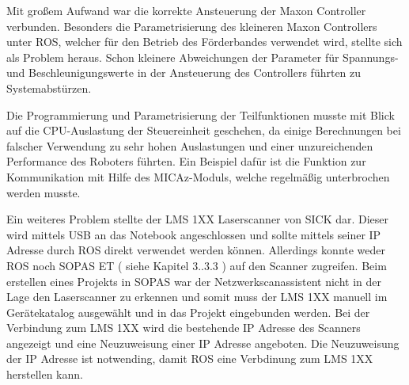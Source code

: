 Mit großem Aufwand war die korrekte Ansteuerung der Maxon Controller verbunden. Besonders die Parametrisierung des kleineren Maxon Controllers unter ROS, welcher für den Betrieb des Förderbandes verwendet wird, stellte sich als Problem heraus. Schon kleinere Abweichungen der Parameter für Spannungs- und Beschleunigungswerte in der Ansteuerung des Controllers führten zu Systemabstürzen.
 
Die Programmierung und Parametrisierung der Teilfunktionen musste mit Blick auf
die CPU-Auslastung der Steuereinheit geschehen, da einige Berechnungen bei falscher
Verwendung zu sehr hohen Auslastungen und einer unzureichenden Performance des
Roboters führten. Ein Beispiel dafür ist die Funktion zur Kommunikation mit Hilfe des MICAz-Moduls, welche     regelmäßig unterbrochen werden musste.

Ein weiteres Problem stellte der LMS 1XX Laserscanner von SICK dar. Dieser wird mittels USB an das Notebook angeschlossen und sollte mittels seiner IP Adresse durch ROS direkt verwendet werden können. Allerdings konnte weder ROS noch SOPAS ET ( siehe Kapitel 3..3.3 ) auf den Scanner zugreifen. Beim erstellen eines Projekts in SOPAS war der Netzwerkscanassistent nicht in der Lage den Laserscanner zu erkennen und somit muss der LMS 1XX manuell im Gerätekatalog ausgewählt und in das Projekt eingebunden werden. Bei der Verbindung zum LMS 1XX wird die bestehende IP Adresse des Scanners angezeigt und eine Neuzuweisung einer IP Adresse angeboten. Die Neuzuweisung der IP Adresse ist notwending, damit ROS eine Verbdinung zum LMS 1XX herstellen kann.
